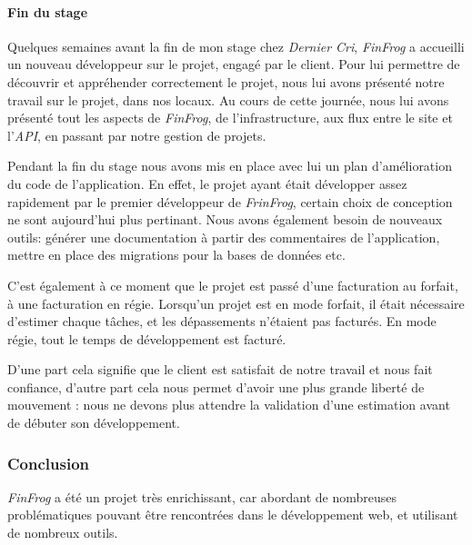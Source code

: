 \documentclass[12pt,a4paper]{article}
\begin{document}
  \paragraph{Fin du stage}\label{fin-du-stage}

  Quelques semaines avant la fin de mon stage chez \emph{Dernier Cri},
  \emph{FinFrog} a accueilli un nouveau développeur sur le projet, engagé
  par le client. Pour lui permettre de découvrir et appréhender
  correctement le projet, nous lui avons présenté notre travail sur le
  projet, dans nos locaux. Au cours de cette journée, nous lui avons
  présenté tout les aspects de \emph{FinFrog}, de l'infrastructure, aux
  flux entre le site et l'\emph{API}, en passant par notre gestion de
  projets.

  \bigskip

  Pendant la fin du stage nous avons mis en place avec lui un plan
  d'amélioration du code de l'application. En effet, le projet ayant était
  développer assez rapidement par le premier développeur de
  \emph{FrinFrog}, certain choix de conception ne sont aujourd'hui plus
  pertinant. Nous avons également besoin de nouveaux outils: générer une
  documentation à partir des commentaires de l'application, mettre en
  place des migrations pour la bases de données etc.

  \bigskip

  C'est également à ce moment que le projet est passé d'une facturation au
  forfait, à une facturation en régie. Lorsqu'un projet est en mode
  forfait, il était nécessaire d'estimer chaque tâches, et les
  dépassements n'étaient pas facturés. En mode régie, tout le temps de
  développement est facturé.

  \bigskip

  D'une part cela signifie que le client est satisfait de notre travail et
  nous fait confiance, d'autre part cela nous permet d'avoir une plus
  grande liberté de mouvement : nous ne devons plus attendre la validation
  d'une estimation avant de débuter son développement.

  \bigskip

  \subsubsection{Conclusion}\label{conclusion-1}

  \bigskip

  \emph{FinFrog} a été un projet très enrichissant, car abordant de
  nombreuses problématiques pouvant être rencontrées dans le développement
  web, et utilisant de nombreux outils.
\end{document}
